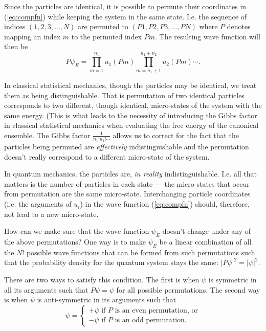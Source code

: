 Since the particles are identical, it is possible to permute their coordinates in (\ref{eq:compfn}) while keeping the system in the same state. I.e. the sequence of indices $(1,2,3,\ldots,N)$ are permuted to $(P1,P2,P3,\ldots,PN)$ where $P$ denotes mapping an index $m$ to the permuted index $Pm$. The resulting wave function will then be
\begin{equation}
	P\psi_E = \prod_{m=1}^{n_1}u_1(Pm)\prod_{m=n_1+1}^{n_1+n_2}u_2(Pm)\cdots.
	\label{eq:permfn}
\end{equation}


In classical statistical mechanics, though the particles may be identical, we treat them as being distinguishable. That is permutation of two identical particles corresponds to two different, though identical, micro-states of the system with the same energy. (This is what leads to the necessity of introducing the Gibbs factor in classical statistical mechanics when evaluating the free energy of the canonical ensemble.  The Gibbs factor $\frac{1}{n_1!n_2!\cdots}$ allows us to correct for the fact that the particles being permuted are \emph{effectively} indistinguishable and the permutation doesn't really correspond to a different micro-state of the system.

In quantum mechanics, the particles are, \emph{in reality} indistinguishable. I.e. all that matters is the number of particles in each state --- the micro-states that occur from permutation are the same micro-state.
Interchanging particle coordinates (i.e. the arguments of $u_i$) in the wave function (\ref{eq:compfn}) should, therefore, not lead to a new micro-state.

How can we make sure that the wave function $\psi_E$ doesn't change under any of the above permutations? One way is to make $\psi_E$ be a linear combination of all the $N!$ possible wave functions that can be formed from such permutations such that the probability density for the quantum system stays the same: $|P\psi|^2=|\psi|^2$.

There are two ways to satisfy this condition. The first is when $\psi$ is symmetric in all its arguments such that $P\psi = \psi$ for all possible permutations. The second way is when $\psi$ is anti-symmetric in its arguments such that
$$
	\psi = 
	\begin{cases}
		+\psi \text{ if $P$ is an even permutation, or}\\
		-\psi \text{ if $P$ is an odd permutation.}
	\end{cases}
$$

